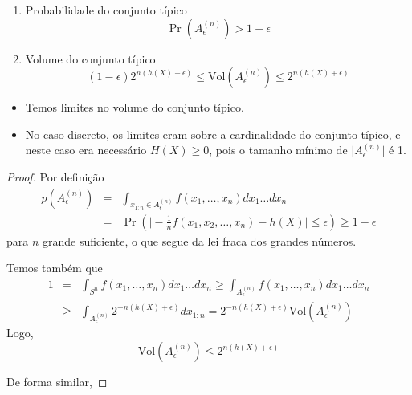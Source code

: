 \begin{frame}[allowframebreaks]
  \begin{theorem}
  \begin{enumerate}
  \item Probabilidade do conjunto típico
	\begin{equation}
	\Pr( A_{\epsilon}^{(n)} ) > 1 - \epsilon
	\end{equation}
  \item Volume do conjunto típico
	\begin{equation}
	(1-\epsilon) 2^{n(h(X) - \epsilon)} \leq \text{Vol}(A_{\epsilon}^{(n)}) \leq 2^{n(h(X)+\epsilon)}
	\end{equation}
  \end{enumerate}
  \end{theorem}
  \begin{itemize}
  \item Temos limites no volume do conjunto típico.
  \item No caso discreto, os limites eram sobre a cardinalidade do conjunto típico, e neste caso
	era necessário $H(X) \geq 0$, pois o tamanho mínimo de $\vert A_{\epsilon}^{(n)} \vert$ é 1.
  \end{itemize}

  \framebreak

  \begin{proof}
  Por definição
  \begin{eqnarray}
	p(A_{\epsilon}^{(n)}) &=& \int_{x_{1:n} \in A_{\epsilon}^{(n)}} f(x_1, \ldots, x_n) dx_1 \ldots dx_n \\
		&=& \Pr \left( \vert - \frac{1}{n} f(x_1,x_2,\ldots,x_n) - h(X) \vert \leq \epsilon \right) \geq 1 - \epsilon \nonumber
  \end{eqnarray}
  	para $n$ grande suficiente, o que segue da lei fraca dos grandes números.

  \proofbreak
  Temos também que
  \begin{eqnarray}
	1 &=& \int_{S^n} f(x_1, \ldots, x_n) dx_1 \ldots dx_n \geq \int_{A_{\epsilon}^{(n)}} f(x_1, \ldots, x_n) dx_1 \ldots dx_n \nonumber \\
		&\geq& \int_{A_{\epsilon}^{(n)}} 2^{-n(h(X) + \epsilon)} dx_{1:n} = 2^{-n(h(X) + \epsilon)} \text{Vol}(A_{\epsilon}^{(n)})
  \end{eqnarray}
  Logo,
	\begin{equation}
	 \text{Vol}(A_{\epsilon}^{(n)}) \leq 2^{n(h(X) + \epsilon)}
	\end{equation}

  \proofbreak 
  De forma similar,


\end{proof}
\end{frame}
